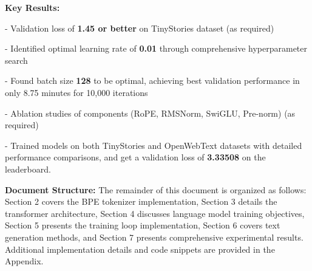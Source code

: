 \textbf{Key Results:}

- Validation loss of \textbf{1.45 or better} on TinyStories dataset (as required)

- Identified optimal learning rate of \textbf{0.01} through comprehensive hyperparameter search

- Found batch size \textbf{128} to be optimal, achieving best validation performance in only 8.75 minutes for 10,000 iterations

- Ablation studies of components (RoPE, RMSNorm, SwiGLU, Pre-norm) (as required)

- Trained models on both TinyStories and OpenWebText datasets with detailed performance comparisons, and get a validation loss of \textbf{3.33508} on the leaderboard.

\textbf{Document Structure:} 
The remainder of this document is organized as follows: Section 2 covers the BPE tokenizer implementation, Section 3 details the transformer architecture, Section 4 discusses language model training objectives, Section 5 presents the training loop implementation, Section 6 covers text generation methods, and Section 7 presents comprehensive experimental results. Additional implementation details and code snippets are provided in the Appendix.